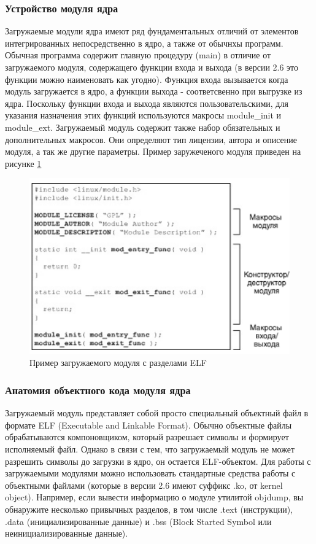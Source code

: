 \subsubsection{Устройство модуля ядра}
Загружаемые модули ядра имеют ряд фундаментальных отличий от элементов интегрированных непосредственно в ядро, а также от обычнхы программ. Обычная программа содержит главную процедуру (main) в отличие от загружаемого модуля, содержащего функции входа и выхода (в версии 2.6 это функции можно наименовать как угодно). Функция входа вызывается когда модуль загружается в ядро, а функции выхода - соответсвенно при выгрузке из ядра.
Поскольку функции входа и выхода являются пользовательскими, для указания назначения этих функций используются макросы module\_init и module\_ext.
Загружаемый модуль содержит также набор обязательных и дополнительных макросов.
Они определяют тип лицензии, автора и описение модуля, а так же другие параметры.
Пример заружеченого модуля приведен на рисунке \ref{fig:coreexample}

\begin{figure}[H]
	\centering
	\includegraphics[width=0.7\linewidth]{src/img/core_example}
	\caption{Пример загружаемого модуля с разделами ELF}
	\label{fig:coreexample}
\end{figure}

\subsubsection{Анатомия объектного кода модуля ядра}
Загружаемый модуль представляет собой просто специальный объектный файл в формате ELF (Executable and Linkable Format). 
Обычно объектные файлы обрабатываются компоновщиком, который разрешает символы и формирует исполняемый файл. 
Однако в связи с тем, что загружаемый модуль не может разрешить символы до загрузки в ядро, он остается ELF-объектом. 
Для работы с загружаемыми модулями можно использовать стандартные средства работы с объектными файлами (которые в версии 2.6 имеют суффикс .ko, от kernel object). 
Например, если вывести информацию о модуле утилитой objdump, вы обнаружите несколько привычных разделов, в том числе .text (инструкции), .data (инициализированные данные) и .bss (Block Started Symbol или неинициализированные данные).

